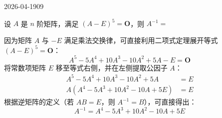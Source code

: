 \begin{mistake}{2026-04-19}{09}

\begin{problemcontent}
设 \(A\) 是 \(n\) 阶矩阵，满足 \((A-E)^5 = \mathbf{O}\)，则 \(A^{-1} =\) \underline{\hspace{2cm}}
\end{problemcontent}

\begin{solutioncontent}
因为矩阵 \(A\) 与 \(-E\) 满足乘法交换律，可直接利用二项式定理展开等式 \((A-E)^5 = \mathbf{O}\)：
\[ A^5 - 5A^4 + 10A^3 - 10A^2 + 5A - E = \mathbf{O} \]
将常数项矩阵 \(E\) 移至等式右侧，并在左侧提取公因子 \(A\)：
\[
\begin{aligned}
A^5 - 5A^4 + 10A^3 - 10A^2 + 5A &= E \\
A(A^4 - 5A^3 + 10A^2 - 10A + 5E) &= E
\end{aligned}
\]
根据逆矩阵的定义（若 \(AB=E\)，则 \(A^{-1}=B\)），可直接得出：
\[ A^{-1} = A^4 - 5A^3 + 10A^2 - 10A + 5E \]
\end{solutioncontent}


\end{mistake}
